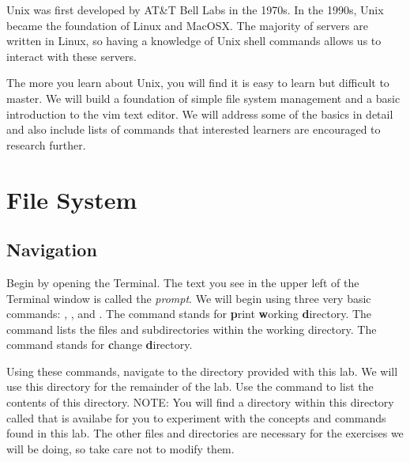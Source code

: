 \label{lab:Shell}


Unix was first developed by AT\&T Bell Labs in the 1970s. In the 1990s, Unix became the foundation of Linux and MacOSX. The majority of servers are written in Linux, so having a knowledge of Unix shell commands allows us to interact with these servers. 

The more you learn about Unix, you will find it is easy to learn but difficult to master. We will build a foundation of simple file system management and a basic introduction to the vim text editor.  
We will address some of the basics in detail and also include lists of commands that interested learners are encouraged to research further.

\section*{File System}
\subsection*{Navigation}

Begin by opening the Terminal. The text you see in the upper left of the Terminal window is called the \emph{prompt}. We will begin using three very basic commands: , , and . The  command stands for \textbf{p}rint \textbf{w}orking \textbf{d}irectory. The  command lists the files and subdirectories within the working directory. The  command stands for \textbf{c}hange \textbf{d}irectory.


\begin{problem}
Using these commands, navigate to the  directory provided with this lab. We will use this directory for the remainder of the lab. Use the  command to list the contents of this directory. NOTE: You will find a directory within this directory called  that is availabe for you to experiment with the concepts and commands found in this lab. The other files and directories are necessary for the exercises we will be doing, so take care not to modify them.
\end{problem}

